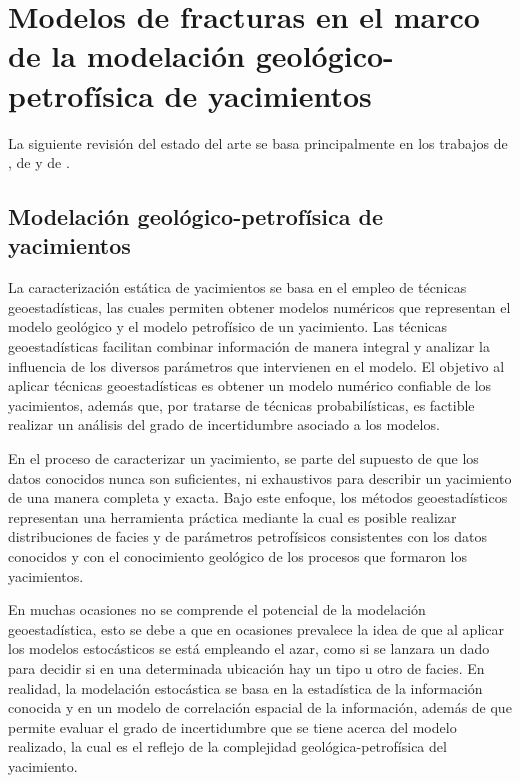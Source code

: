 \chapter{Modelos de fracturas en el marco de la modelaci\'on geol\'ogico-petrof\'isica de yacimientos}
\label{s:eda} %

La siguiente revisi\'on del estado del arte se basa principalmente en los trabajos de \cite{cosentino_integrated_2001}, de \citet{deutsch_geostatistical_2002}  y de \cite{pyrcz_geostatistical_2014}.

\section{Modelaci\'on  geol\'ogico-petrof\'isica de yacimientos}

La caracterizaci\'on est\'atica de yacimientos se basa en el empleo de t\'ecnicas geoestad\'isticas, las cuales permiten obtener modelos num\'ericos que representan el modelo geol\'ogico y el modelo petrof\'isico de un yacimiento. Las t\'ecnicas geoestad\'isticas facilitan combinar informaci\'on de manera integral y analizar la influencia de los diversos par\'ametros que intervienen en el modelo. El objetivo al aplicar t\'ecnicas geoestad\'isticas es obtener un modelo num\'erico confiable de los yacimientos, adem\'as que, por tratarse de t\'ecnicas probabil\'isticas, es factible realizar un an\'alisis del grado de incertidumbre asociado a los modelos.

En el proceso de caracterizar un yacimiento, se parte del supuesto de que los datos conocidos nunca son suficientes, ni exhaustivos para describir un yacimiento de una manera completa y exacta. Bajo este enfoque, los m\'etodos geoestad\'isticos representan una herramienta pr\'actica mediante la cual es posible realizar distribuciones de facies y de par\'ametros petrof\'isicos consistentes con los datos conocidos y con el conocimiento geol\'ogico de los procesos que formaron los yacimientos.

En muchas ocasiones no se comprende el potencial de la modelaci\'on geoestad\'istica, esto se debe a que en ocasiones prevalece la idea de que al aplicar los modelos estoc\'asticos se est\'a empleando el azar, como si se lanzara un dado para decidir si en una determinada ubicaci\'on hay un tipo u otro de facies. En realidad, la modelaci\'on estoc\'astica se basa en la estad\'istica de la informaci\'on conocida y en un modelo de correlaci\'on espacial de la informaci\'on, adem\'as de que permite evaluar el grado de incertidumbre que se tiene acerca del modelo realizado, la cual es el reflejo de la complejidad geol\'ogica-petrof\'isica del yacimiento.

